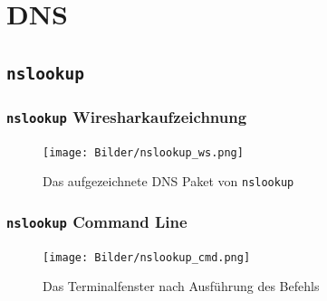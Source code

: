 \documentclass{article}
\begin{document}
	\section{DNS}
	\cprotect\subsection{\verb|nslookup|}
	\addtocounter{subsubsection}{3}
	\cprotect\subsubsection{\verb|nslookup|  Wiresharkaufzeichnung}
	\begin{figure}[H]
	\centering
	\texttt{[image: Bilder/nslookup\_ws.png]}
	\cprotect\caption{Das aufgezeichnete DNS Paket von \verb|nslookup| }
	\end{figure}
	\cprotect\subsubsection{\verb|nslookup|  Command Line} 
	\begin{figure}[H]
	\centering
	\texttt{[image: Bilder/nslookup\_cmd.png]}
	\caption{Das Terminalfenster nach Ausführung des Befehls}
	\end{figure}
\end{document}
